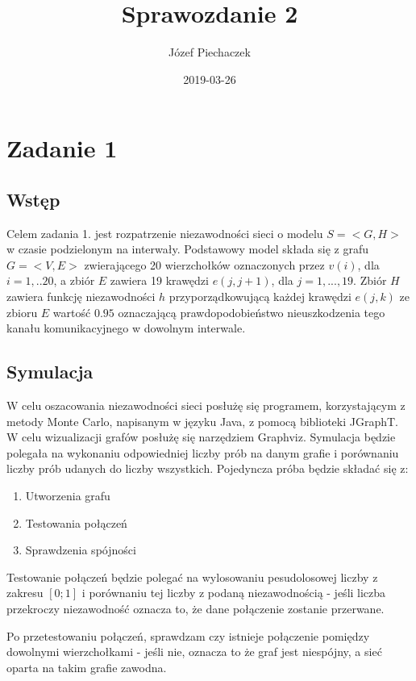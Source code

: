 \documentclass[titlepage]{article}
\title{Sprawozdanie 2}
\date{2019-03-26}
\author{Józef Piechaczek}
\begin{document}
\maketitle
\newpage
{}

\section{Zadanie 1}

\subsection{Wstęp}
Celem zadania 1. jest rozpatrzenie niezawodności sieci o modelu $S = <G, H>$ w czasie podzielonym na interwały. 
Podstawowy model składa się z grafu \linebreak $G = <V, E>$ zwierającego 20 wierzchołków oznaczonych przez $v(i)$, dla \linebreak $i = 1,..20$, a zbiór $E$ zawiera 19 krawędzi $e(j,j+1)$, dla $j = 1, ...,19$. Zbiór $H$ zawiera funkcję niezawodności $h$ przyporządkowującą każdej krawędzi $e(j,k)$ ze zbioru $E$ wartość $0.95$ oznaczającą prawdopodobieństwo nieuszkodzenia tego kanału komunikacyjnego w dowolnym interwale. 

\subsection{Symulacja}
W celu oszacowania niezawodności sieci posłużę się programem, korzystającym z metody Monte Carlo, napisanym w języku Java, z pomocą biblioteki JGraphT. W celu wizualizacji grafów posłużę się narzędziem Graphviz. Symulacja będzie polegała na wykonaniu odpowiedniej liczby prób na danym grafie i porównaniu liczby prób udanych do liczby wszystkich. Pojedyncza próba będzie składać się z:
\begin{enumerate}
\itemsep0em 
\item Utworzenia grafu
\item Testowania połączeń
\item Sprawdzenia spójności
\end{enumerate}
Testowanie połączeń będzie polegać na wylosowaniu pesudolosowej liczby z zakresu $[0; 1]$
i porównaniu tej liczby z podaną niezawodnością - jeśli liczba przekroczy niezawodność oznacza to, że dane połączenie zostanie przerwane.

Po przetestowaniu połączeń, sprawdzam czy istnieje połączenie pomiędzy dowolnymi wierzchołkami - jeśli nie, oznacza to że graf jest niespójny, a sieć oparta na takim grafie zawodna. 
\end{document}
